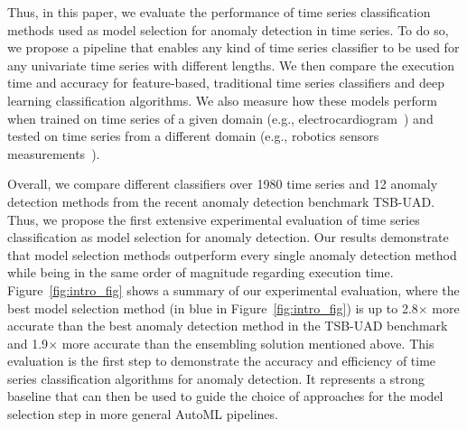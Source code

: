 Thus, in this paper, we evaluate the performance of time series classification methods used as model selection for anomaly detection in time series. To do so, we propose a pipeline that enables any kind of time series classifier to be used for any univariate time series with different lengths. We then compare the execution time and accuracy for feature-based, traditional time series classifiers and deep learning classification algorithms. We also measure how these models perform when trained on time series of a given domain (e.g., electrocardiogram~\cite{Moody}) and tested on time series from a different domain (e.g., robotics sensors measurements~\cite{5573462}). 

Overall, we compare  different classifiers over 1980 time series and 12 anomaly detection methods from the recent anomaly detection benchmark TSB-UAD. Thus, we propose the first extensive experimental evaluation of time series classification as model selection for anomaly detection. Our results demonstrate that model selection methods outperform every single anomaly detection method while being in the same order of magnitude regarding execution time. Figure~\ref{fig:intro_fig} shows a summary of our experimental evaluation, where the best model selection method (in blue in Figure~\ref{fig:intro_fig}) is up to 2.8$\times$ more accurate than the best anomaly detection method in the TSB-UAD benchmark and 1.9$\times$ more accurate than the ensembling solution mentioned above. This evaluation is the first step to demonstrate the accuracy and efficiency of time series classification algorithms for anomaly detection. It represents a strong baseline that can then be used to guide the choice of approaches for the model selection step in more general AutoML pipelines.

